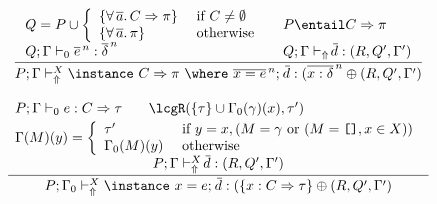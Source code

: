 \begin{figure}
\[\begin{array}{cc}
	\displaystyle\frac
	 {\begin{array}{ll}
               Q = P \cup \left \{ \begin{array}{ll}
                         \{ \forall\,\overline{a}.\,C \Rightarrow \pi \} & \text{ if } C \not= \emptyset \\
                         \{ \forall\,\overline{a}.\,\pi \} & \text{ otherwise}
                                \end{array}\right. \: & \: 
               P \entail C \Rightarrow \pi \\
           Q;\Gamma \vdash_0 \overline{e}^{\,n} : \overline{\delta}^{\,n} \: & \: 
	   Q;\Gamma \vdash_{\Uparrow} \overline{\!d} : (R,Q',\Gamma') 
          \end{array}}
	 {P;\Gamma \vdash_{\Uparrow}^X \instance\ C \Rightarrow \pi\ \where\ \overline{x = e}^{\,n};\: \overline{\!d} 
             : (\overline{x : \delta}^{\,n} \oplus (R,Q',\Gamma')}\\ \\

	\displaystyle\frac
	 {\begin{array}{ll}
            P; \Gamma \vdash_0 e : C \Rightarrow \tau \:\: & \:\:
            \lcgR(\{ \tau\} \cup \Gamma_0(\gamma)(x), \tau') \\[.1cm]
            \multicolumn{2}{c}{\Gamma(M)(y) = \left\{ \begin{array}{ll}
                                      \tau' & \text{ if } y = x, (M = \gamma \text{ or }
                                                                 (M = \texttt{[]}, x \in X)) \\
                                      \Gamma_0(M)(y) & \text{ otherwise } 
                                   \end{array}\right.}\\[.2cm]                   
           \multicolumn{2}{c}{P;\Gamma \vdash_{\Uparrow}^X \overline{\!d} : (R,Q',\Gamma')} 
          \end{array}}
	 {P;\Gamma_0 \vdash_{\Uparrow}^X \instance\ x = e;\: \overline{\!d} : (\{x:C\Rightarrow \tau\} \oplus (R,Q',\Gamma')} \\ \\


\end{array}\]
\end{figure}
